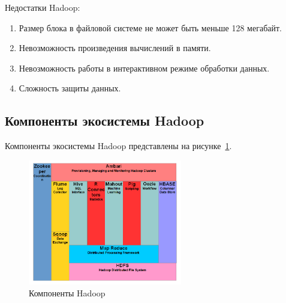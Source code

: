 Недостатки Hadoop:
\begin{enumerate}
    \item Размер блока в файловой системе не может быть меньше 128 мегабайт.
    \item Невозможность произведения вычислений в памяти.
    \item Невозможность работы в интерактивном режиме обработки данных.
    \item Сложность защиты данных.
\end{enumerate}

\subsection{Компоненты экосистемы Hadoop}
Компоненты экосистемы Hadoop представлены на рисунке~\ref{fig:hadoop_ecosystem}.

\begin{figure}[H]
    \centering
    \includegraphics[width=0.6\textwidth]{hadoop_ecosystem}
    \caption{Компоненты Hadoop}
    \label{fig:hadoop_ecosystem}
\end{figure}

